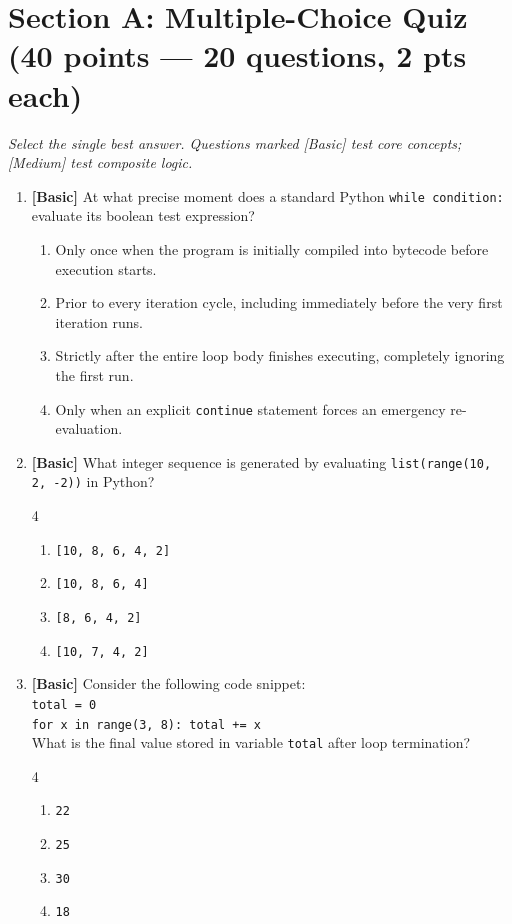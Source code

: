 \documentclass[11pt,a4paper]{article}
\begin{document}
\vspace{2.5mm}
\section*{Section A: Multiple-Choice Quiz \hfill \normalsize\normalfont(40 points --- 20 questions, 2 pts each)}
\textit{Select the single best answer. Questions marked [Basic] test core concepts; [Medium] test composite logic.}

\begin{enumerate}[label=\textbf{Q\arabic*.},leftmargin=1.8em,itemsep=0.6pt,topsep=0.2pt]

\item \textbf{[Basic]} At what precise moment does a standard Python \texttt{while condition:} evaluate its boolean test expression?
\begin{enumerate}[label=\Alph*.,leftmargin=1.8em]
  \item Only once when the program is initially compiled into bytecode before execution starts.
  \item Prior to every iteration cycle, including immediately before the very first iteration runs.
  \item Strictly after the entire loop body finishes executing, completely ignoring the first run.
  \item Only when an explicit \texttt{continue} statement forces an emergency re-evaluation.
\end{enumerate}

\item \textbf{[Basic]} What integer sequence is generated by evaluating \texttt{list(range(10, 2, -2))} in Python?
\begin{multicols}{4}
\begin{enumerate}[label=\Alph*.]
  \item \texttt{[10, 8, 6, 4, 2]}
  \item \texttt{[10, 8, 6, 4]}
  \item \texttt{[8, 6, 4, 2]}
  \item \texttt{[10, 7, 4, 2]}
\end{enumerate}
\end{multicols}

\item \textbf{[Basic]} Consider the following code snippet:\\
\texttt{total = 0}\\
\texttt{for x in range(3, 8): total += x}\\
What is the final value stored in variable \texttt{total} after loop termination?
\begin{multicols}{4}
\begin{enumerate}[label=\Alph*.]
  \item \texttt{22}
  \item \texttt{25}
  \item \texttt{30}
  \item \texttt{18}
\end{enumerate}
\end{multicols}


\end{enumerate}
\end{document}
